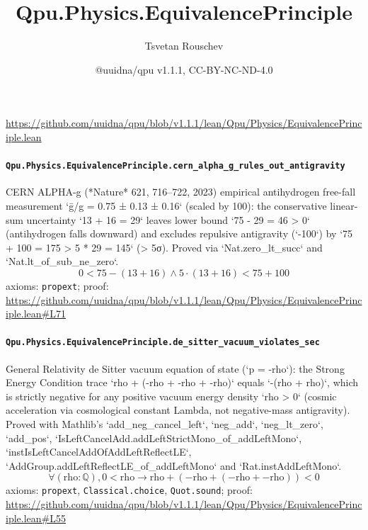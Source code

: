 \documentclass[11pt]{article}
\title{Qpu.Physics.EquivalencePrinciple}
\author{Tsvetan Rouschev}
\date{@uuidna/qpu v1.1.1, CC-BY-NC-ND-4.0}
\begin{document}
\maketitle
\noindent\url{https://github.com/uuidna/qpu/blob/v1.1.1/lean/Qpu/Physics/EquivalencePrinciple.lean}

\paragraph{\texttt{Qpu.Physics.EquivalencePrinciple.cern\_alpha\_g\_rules\_out\_antigravity}}
CERN ALPHA-g (*Nature* 621, 716–722, 2023) empirical antihydrogen free-fall measurement `ḡ/g = 0.75 ± 0.13 ± 0.16` (scaled by 100): the conservative linear-sum uncertainty `13 + 16 = 29` leaves lower bound `75 - 29 = 46 > 0` (antihydrogen falls downward) and excludes repulsive antigravity (`-100`) by `75 + 100 = 175 > 5 * 29 = 145` (> 5σ). Proved via `Nat.zero\_lt\_succ` and `Nat.lt\_of\_sub\_ne\_zero`.
\[ 0 < 75 - (13 + 16) \land 5 \cdot (13 + 16) < 75 + 100 \]
\noindent axioms: \texttt{propext}; proof: \url{https://github.com/uuidna/qpu/blob/v1.1.1/lean/Qpu/Physics/EquivalencePrinciple.lean\#L71}

\paragraph{\texttt{Qpu.Physics.EquivalencePrinciple.de\_sitter\_vacuum\_violates\_sec}}
General Relativity de Sitter vacuum equation of state (`p = -rho`): the Strong Energy Condition trace `rho + (-rho + -rho + -rho)` equals `-(rho + rho)`, which is strictly negative for any positive vacuum energy density `rho > 0` (cosmic acceleration via cosmological constant Lambda, not negative-mass antigravity). Proved with Mathlib's `add\_neg\_cancel\_left`, `neg\_add`, `neg\_lt\_zero`, `add\_pos`, `IsLeftCancelAdd.addLeftStrictMono\_of\_addLeftMono`, `instIsLeftCancelAddOfAddLeftReflectLE`, `AddGroup.addLeftReflectLE\_of\_addLeftMono` and `Rat.instAddLeftMono`.
\[ \forall (\mathrm{rho} : \mathbb{Q}), 0 < \mathrm{rho} \to \mathrm{rho} + (-\mathrm{rho} + (-\mathrm{rho} + -\mathrm{rho})) < 0 \]
\noindent axioms: \texttt{propext}, \texttt{Classical.choice}, \texttt{Quot.sound}; proof: \url{https://github.com/uuidna/qpu/blob/v1.1.1/lean/Qpu/Physics/EquivalencePrinciple.lean\#L55}
\end{document}
